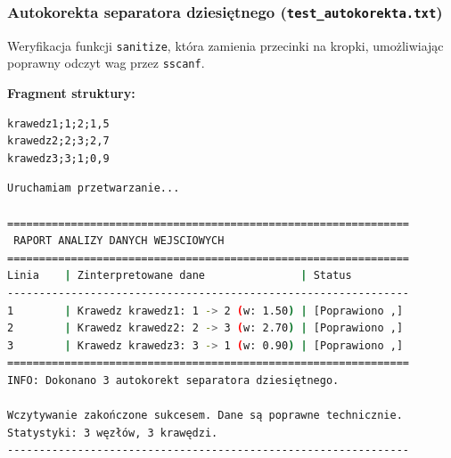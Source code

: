 \documentclass[12pt,a4paper]{article}
\begin{document}
\subsubsection{Autokorekta separatora dziesiętnego (\texttt{test\_autokorekta.txt})}
Weryfikacja funkcji \texttt{sanitize}, która zamienia przecinki na kropki, umożliwiając poprawny odczyt wag przez \texttt{sscanf}.

\textbf{Fragment struktury:} \begin{verbatim}
krawedz1;1;2;1,5
krawedz2;2;3;2,7
krawedz3;3;1;0,9
\end{verbatim}

\begin{lstlisting}[language=bash, caption={Log terminala - INFO: Dokonano autokorekt}]
Uruchamiam przetwarzanie...

===============================================================
 RAPORT ANALIZY DANYCH WEJSCIOWYCH 
===============================================================
Linia    | Zinterpretowane dane               | Status         
---------------------------------------------------------------
1        | Krawedz krawedz1: 1 -> 2 (w: 1.50) | [Poprawiono ,] 
2        | Krawedz krawedz2: 2 -> 3 (w: 2.70) | [Poprawiono ,] 
3        | Krawedz krawedz3: 3 -> 1 (w: 0.90) | [Poprawiono ,] 
===============================================================
INFO: Dokonano 3 autokorekt separatora dziesiętnego.

Wczytywanie zakończone sukcesem. Dane są poprawne technicznie.
Statystyki: 3 węzłów, 3 krawędzi.
---------------------------------------------------------------

\end{lstlisting}
\newpage
\end{document}
